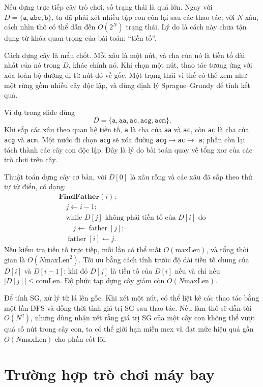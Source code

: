 \documentclass[11pt]{article}
\begin{document}
Nếu dựng trực tiếp cây trò chơi, số trạng thái là quá lớn. Ngay với
\(D=\{\texttt{a},\texttt{abc},\texttt{b}\}\), ta đã phải xét nhiều tập con còn
lại sau các thao tác; với \(N\) xâu, cách nhìn thô có thể dẫn đến
\(O(2^N)\) trạng thái. Lý do là cách này chưa tận dụng từ khóa quan trọng của
bài toán: ``tiền tố''.

Cách dựng cây là mấu chốt. Mỗi xâu là một nút, và cha của nó là tiền tố dài
nhất của nó trong \(D\), khác chính nó. Khi chọn một nút, thao tác tương ứng
với xóa toàn bộ đường đi từ nút đó về gốc. Một trạng thái vì thế có thể xem
như một rừng gồm nhiều cây độc lập, và dùng định lý Sprague--Grundy để tính
kết quả.

Ví dụ trong slide dùng
\[
  D=\{\texttt{a},\texttt{aa},\texttt{ac},\texttt{acg},\texttt{acm}\}.
\]
Khi sắp các xâu theo quan hệ tiền tố, \texttt{a} là cha của \texttt{aa} và
\texttt{ac}, còn \texttt{ac} là cha của \texttt{acg} và \texttt{acm}. Một
nước đi chọn \texttt{acg} sẽ xóa đường \texttt{acg}\(\to\)\texttt{ac}\(\to\)
\texttt{a}; phần còn lại tách thành các cây con độc lập. Đây là lý do bài toán
quay về tổng xor của các trò chơi trên cây.

Thuật toán dựng cây cơ bản, với \(D[0]\) là xâu rỗng và các xâu đã sắp theo
thứ tự từ điển, có dạng:
\[
\begin{array}{l}
\textbf{FindFather}(i):\\
\quad j\gets i-1;\\
\quad \text{while }D[j]\text{ không phải tiền tố của }D[i]\text{ do}\\
\quad\quad j\gets \operatorname{father}[j];\\
\quad \operatorname{father}[i]\gets j.
\end{array}
\]
Nếu kiểm tra tiền tố trực tiếp, mỗi lần có thể mất \(O(\text{maxLen})\), và
tổng thời gian là \(O(N\text{maxLen}^2)\). Tối ưu bằng cách tính trước độ dài
tiền tố chung của \(D[i]\) và \(D[i-1]\): khi đó \(D[j]\) là tiền tố của
\(D[i]\) nếu và chỉ nếu \(|D[j]|\le \text{comLen}\). Độ phức tạp dựng cây
giảm còn \(O(N\text{maxLen})\).

Để tính SG, xử lý từ lá lên gốc. Khi xét một nút, có thể liệt kê các thao tác
bằng một lần DFS và đồng thời tính giá trị SG sau thao tác. Nếu làm thô sẽ
dẫn tới \(O(N^2)\), nhưng dùng nhận xét rằng giá trị SG của một cây con không
thể vượt quá số nút trong cây con, ta có thể giới hạn miền mex và đạt mức
hiệu quả gần \(O(N\text{maxLen})\) cho phần cốt lõi.

\section{Trường hợp trò chơi máy bay}
\end{document}

